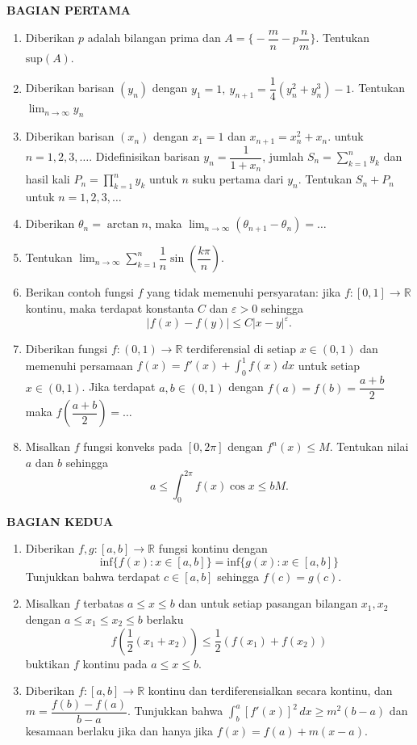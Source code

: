 \documentclass[12pt,twoside]{article}
\begin{document}
\textbf{BAGIAN PERTAMA}
\begin{enumerate}
	\item Diberikan $p$ adalah bilangan prima dan $A=\bigg \{-\dfrac{m}{n}-p\dfrac{n}{m}\bigg\}$. Tentukan $\text{sup}(A)$.
	\item Diberikan barisan $(y_n)$ dengan $y_1=1,~y_{n+1}=\dfrac{1}{4}\left(y_{n}^2+y_{n}^3\right)-1$. Tentukan $\displaystyle\lim_{n\to \infty}y_n$
	\item Diberikan barisan $(x_n)$ dengan $x_1=1$ dan $x_{n+1}=x_n^2+x_n$. untuk $n=1,2,3,\dots$. Didefinisikan barisan $y_n=\dfrac{1}{1+x_n}$, jumlah $\displaystyle S_n=\sum_{k=1}^{n}y_k$ dan hasil kali $\displaystyle P_n=\prod_{k=1}^{n}y_k$ untuk $n$ suku pertama dari $y_n$. Tentukan $S_n+P_n$ untuk $n=1,2,3,\dots$
	\item Diberikan $\theta_n=\arctan n$, maka $\displaystyle \lim_{n\to \infty}(\theta_{n+1}-\theta_n)=\dots$
	\item Tentukan $\displaystyle \lim_{n\to \infty}\sum_{k=1}^{n}\dfrac{1}{n}\sin\left(\dfrac{k\pi}{n}\right)$.
	\item Berikan contoh fungsi $f$ yang tidak memenuhi persyaratan: jika $f:[0,1]\to \mathbb{R}$ kontinu, maka terdapat konstanta $C$ dan $\varepsilon>0$ sehingga $$|f(x)-f(y)|\leq C|x-y|^\varepsilon.$$
	\item Diberikan fungsi $f:(0,1)\to \mathbb{R}$ terdiferensial di setiap $x\in(0,1)$ dan memenuhi persamaan $\displaystyle f(x)=f'(x)+\int_{0}^{1}f(x)\,dx$ untuk setiap $x\in(0,1)$. Jika terdapat $a,b\in(0,1)$ dengan $f(a)=f(b)=\dfrac{a+b}{2}$ maka $f\left(\dfrac{a+b}{2}\right)=\dots$
	\item Misalkan $f$ fungsi konveks pada $[0,2\pi]$ dengan $f^n(x)\leq M$. Tentukan nilai $a$ dan $b$ sehingga $$a\leq \int_{0}^{2\pi}f(x)\cos x\leq bM.$$
\end{enumerate}
\newpage \textbf{BAGIAN KEDUA}
\begin{enumerate}
	\item Diberikan $f,g:[a,b]\to \mathbb{R}$ fungsi kontinu dengan
	      $$\text{inf}\{f(x):x\in[a,b] \}=\text{inf}\{g(x):x\in[a,b] \}$$
	      Tunjukkan bahwa terdapat $c\in [a,b]$ sehingga $f(c)=g(c)$.

	\item Misalkan $f$ terbatas $a\leq x\leq b$ dan untuk setiap pasangan bilangan $x_1,x_2$ dengan $a\leq x_1\leq x_2\leq b$ berlaku $$f\left( \dfrac{1}{2}\left(x_1+x_2\right)\right)\leq \dfrac{1}{2}\left(f(x_1)+f(x_2)\right) $$
	      buktikan $f$ kontinu pada $a\leq x \leq b$.

	\item Diberikan $f:[a,b]\to \mathbb{R}$ kontinu dan terdiferensialkan secara kontinu, dan $m=\dfrac{f(b)-f(a)}{b-a}$. Tunjukkan bahwa $\displaystyle \int_{b}^{a}\left[f'(x)\right]^2\,dx\geq m^2(b-a)$ dan kesamaan berlaku jika dan hanya jika $f(x)=f(a)+m(x-a)$.
\end{enumerate}
\end{document}
